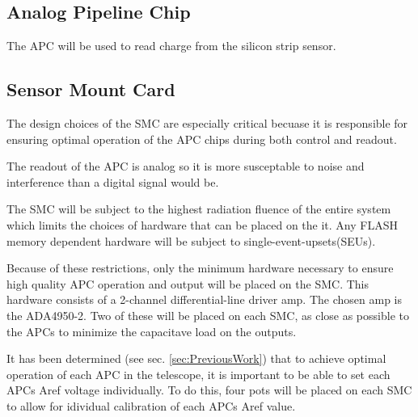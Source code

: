 \documentclass{article}
\begin{document}
\subsection{Analog Pipeline Chip}
The \gls{APC} will be used to read charge from the silicon strip sensor.

\subsection{Sensor Mount Card}
\label{sec:HardProp:SMC}

The design choices of the \gls{SMC} are especially critical becuase it is responsible for ensuring optimal operation of the \gls{APC} chips during both control and readout.

The readout of the \gls{APC} is analog so it is more susceptable to noise and interference than a digital signal would be.

The SMC will be subject to the highest radiation fluence of the entire system which limits the choices of hardware that can be placed on the it. Any FLASH memory dependent hardware will be subject to single-event-upsets(SEUs).

Because of these restrictions, only the minimum hardware necessary to ensure high quality \gls{APC} operation and output will be placed on the SMC. This hardware consists of a 2-channel differential-line driver amp. The chosen amp is the ADA4950-2\cite{ADA4950}. Two of these will be placed on each SMC, as close as possible to the \gls{APC}s to minimize the capacitave load on the outputs.


It has been determined (see sec. \ref{sec:PreviousWork}) that to achieve optimal operation of each \gls{APC} in the telescope, it is important to be able to set each \gls{APC}s Aref voltage individually. To do this, four pots will be placed on each SMC to allow for idividual calibration of each \gls{APC}s Aref value.
\end{document}
